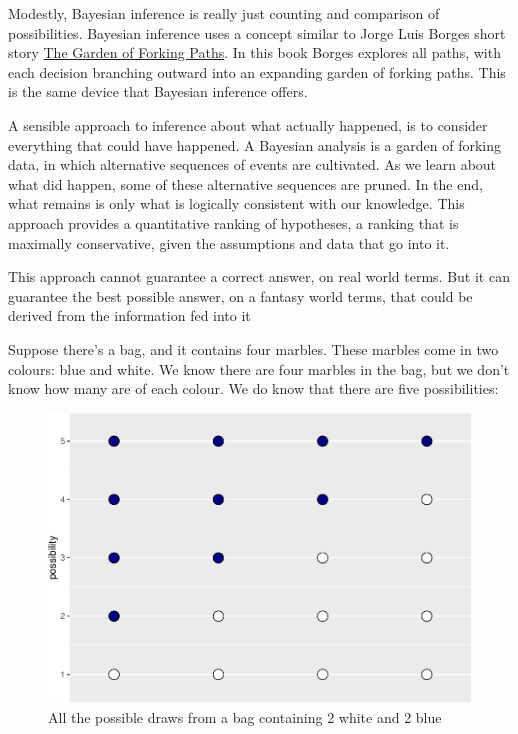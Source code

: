 \documentclass{article}
\begin{document}
Modestly, Bayesian inference is really just counting and comparison of
possibilities. Bayesian inference uses a concept similar to Jorge Luis
Borges short story
\href{https://en.wikipedia.org/wiki/The_Garden_of_Forking_Paths}{The
Garden of Forking Paths}. In this book Borges explores all paths, with
each decision branching outward into an expanding garden of forking
paths. This is the same device that Bayesian inference offers.

A sensible approach to inference about what actually happened, is to
consider everything that could have happened. A Bayesian analysis is a
garden of forking data, in which alternative sequences of events are
cultivated. As we learn about what did happen, some of these alternative
sequences are pruned. In the end, what remains is only what is logically
consistent with our knowledge. This approach provides a quantitative
ranking of hypotheses, a ranking that is maximally conservative, given
the assumptions and data that go into it.

This approach cannot guarantee a correct answer, on real world terms.
But it can guarantee the best possible answer, on a fantasy world terms,
that could be derived from the information fed into it

Suppose there's a bag, and it contains four marbles. These marbles come
in two colours: blue and white. We know there are four marbles in the
bag, but we don't know how many are of each colour. We do know that
there are five possibilities:

\begin{figure}

{\centering \includegraphics{qrap_paper_files/figure-latex/possibilities-1} 

}

\caption{All the possible draws from a bag containing 2 white and 2 blue}\label{fig:possibilities}
\end{figure}
\end{document}
